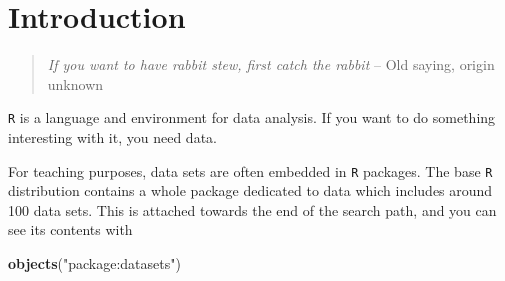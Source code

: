 \documentclass[
]{book}
\newenvironment{Shaded}{\begin{snugshade}}{\end{snugshade}}
\newcommand{\FunctionTok}[1]{\textcolor[rgb]{0.13,0.29,0.53}{\textbf{#1}}}
\newcommand{\NormalTok}[1]{#1}
\newcommand{\StringTok}[1]{\textcolor[rgb]{0.31,0.60,0.02}{#1}}
\theoremstyle{definition}
\theoremstyle{definition}
\theoremstyle{definition}
\theoremstyle{definition}
\theoremstyle{remark}
\begin{document}
\section{Introduction}\label{introduction}

\begin{quote}
\emph{If you want to have rabbit stew, first catch the rabbit} -- Old saying, origin unknown
\end{quote}

\texttt{R} is a language and environment for data analysis. If you
want to do something interesting with it, you need data.

For teaching purposes, data sets are often embedded in \texttt{R}
packages. The base \texttt{R} distribution contains a whole package
dedicated to data which includes around 100 data sets. This is
attached towards the end of the search path, and you can see its
contents with

\begin{Shaded}
\begin{Highlighting}[]
\FunctionTok{objects}\NormalTok{(}\StringTok{"package:datasets"}\NormalTok{)}
\end{Highlighting}
\end{Shaded}
\end{document}
